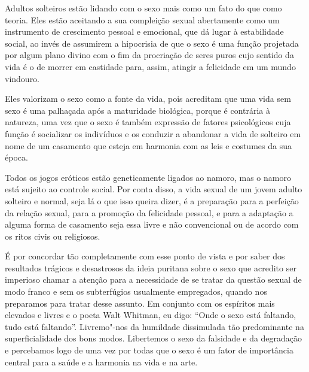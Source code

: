Adultos solteiros estão lidando com o sexo mais como um fato do que como
teoria. Eles estão aceitando a sua compleição sexual abertamente como um
instrumento de crescimento pessoal e emocional, que dá lugar à
estabilidade social, ao invés de assumirem a hipocrisia de que o sexo é
uma função projetada por algum plano divino com o fim da procriação de
seres puros cujo sentido da vida é o de morrer em castidade para, assim,
atingir a felicidade em um mundo vindouro.

Eles valorizam o sexo como a fonte da vida, pois acreditam que uma vida
sem sexo é uma palhaçada após a maturidade biológica, porque é contrária
à natureza, uma vez que o sexo é também expressão de fatores
psicológicos cuja função é socializar os indivíduos e os conduzir a
abandonar a vida de solteiro em nome de um casamento que esteja em
harmonia com as leis e costumes da sua época.

Todos os jogos eróticos estão geneticamente ligados ao namoro, mas o
namoro está sujeito ao controle social. Por conta disso, a vida sexual
de um jovem adulto solteiro e normal, seja lá o que isso queira dizer, é
a preparação para a perfeição da relação sexual, para a promoção da
felicidade pessoal, e para a adaptação a alguma forma de casamento seja
essa livre e não convencional ou de acordo com os ritos civis ou
religiosos.

É por concordar tão completamente com esse ponto de vista e por saber dos
resultados trágicos e desastrosos da ideia puritana sobre o sexo que
acredito ser imperioso chamar a atenção para a necessidade de se tratar
da questão sexual de modo franco e sem os subterfúgios usualmente
empregados, quando nos preparamos para tratar desse assunto. Em conjunto
com os espíritos mais elevados e livres e o poeta Walt Whitman, eu digo:
``Onde o sexo está faltando, tudo está faltando''. Livremo"-nos da
humildade dissimulada tão predominante na superficialidade dos bons
modos. Libertemos o sexo da falsidade e da degradação e percebamos logo
de uma vez por todas que o sexo é um fator de importância central para a
saúde e a harmonia na vida e na arte.


